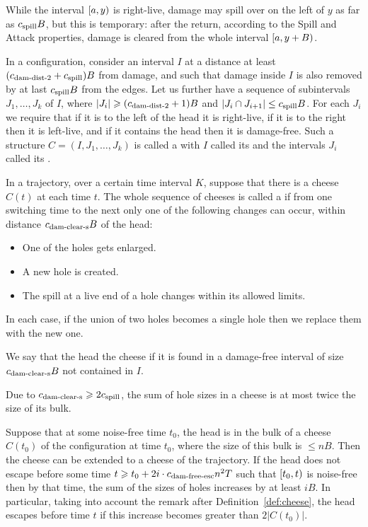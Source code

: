 \documentclass[12pt]{memoir}
\newcommand{\authnote}[3]
{\text{{ \textcolor{#3}{\( \langle\hspace{-0.2em}\langle \)\textsf{\footnotesize #1: #2}\( \rangle\hspace{-0.2em}\rangle \)}}}}
\newcommand{\authnote}[2]{}
\newcommand{\Pnote}[1]{{\authnote{Peter}{#1}{cyan}}}
\renewcommand{\le}{\leq}
\def\B{B}
\newcommand{\Tu}{T}
\newcommand{\cns}[1]{c_{\textrm{\upshape #1}}}
\newcommand{\cDamFreeEsc}{\cns{dam-free-esc}}
\newcommand{\cDamClearS}{\cns{dam-clear-s}}
\newcommand{\cDamDist}[1]{\cns{dam-dist-#1}}
\newcommand{\cSpill}{\cns{spill}}
\begin{document}
While the interval \( [a,y) \) is right-live, 
damage may spill over on the left of \( y \) as far as \( \cSpill \B \), 
but this is temporary: after the return, according to the Spill and Attack
properties, damage is cleared from the whole interval \( \lint{a}{y+\B} \).

\begin{definition}[Cheese]\label{def:cheese}
In a configuration, consider an interval \( I \) at a distance
at least \( (\cDamDist2 +\cSpill )\B \)
from damage, and such that damage inside \( I \) is also removed by at 
last \( \cSpill \B \) from the edges.
Let us further have a sequence of subintervals \( J_{1},\dots,J_{k} \) of \( I \),
where \( |J_{i}|\ge (\cDamDist2 +1)\B \) and
\( |J_{i}\cap J_{i+1}|\le\cSpill \B \).
For each \( J_{i} \) we require that if it is to the left of the head it is 
right-live, if it is to the right then it is left-live,
and if it contains the head then it is damage-free.
Such a structure \( C=(I,J_{1},\dots,J_{k}) \) 
is called a  with \( I \) called its  and
the intervals \( J_{i} \)  called its .
\Pnote{Picture?}

In a trajectory, over a certain time interval \( K \),
suppose that there is a cheese \( C(t) \) at each time \( t \).
The whole sequence of cheeses is called a 
if from  one switching time to the next only one of
the following changes can occur, within distance \( \cDamClearS \B \)
of the head: 
\begin{itemize}
\item One of the holes gets enlarged.
\item A new hole is created.
\item The spill at a live end of a hole changes within its allowed limits.
\end{itemize}
In each case, if the union of two holes becomes a single hole then we replace them
with the new one.

We say that the head  the cheese if it is found %
in a damage-free interval of size \( \cDamClearS \B  \) not contained in \( I \).
\end{definition}

Due to \( \cDamClearS \ge 2\cSpill \),
the sum of hole sizes in a cheese is at most twice the size of its bulk.

\begin{lemma}[Escape]\label{lem:escape}
Suppose that at some noise-free time 
\( t_{0} \), the head is in the bulk of a cheese \( C(t_{0}) \) 
of the configuration at time \( t_{0} \), where the size of this bulk is 
\( \le n\B \).
Then the cheese can be extended to a cheese of the trajectory.
If the head does not escape before some time
\( t\ge t_{0}+ 2i\cdot\cDamFreeEsc n^{2}\Tu \) such that \( [t_{0},t) \) is
noise-free 
then by that time, the sum of the sizes of holes increases by at least
\( i\B \).
In particular, taking into account the remark after Definition~\ref{def:cheese},
the head escapes before time \( t \) if 
this increase becomes greater than \( 2|C(t_{0})| \).
  \end{lemma}
\end{document}
